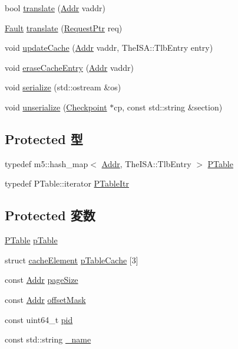 \begin{DoxyCompactItemize}
\item 
bool \hyperlink{classPageTable_a72077eb2c400826c0a18b845a7be0e6a}{translate} (\hyperlink{base_2types_8hh_af1bb03d6a4ee096394a6749f0a169232}{Addr} vaddr)
\item 
\hyperlink{classRefCountingPtr}{Fault} \hyperlink{classPageTable_aacd7f462f681cfd6e11ef22d6fe32557}{translate} (\hyperlink{classRequest}{RequestPtr} req)
\item 
void \hyperlink{classPageTable_ad12e4d4887c4e62c2c8236936053dcd5}{updateCache} (\hyperlink{base_2types_8hh_af1bb03d6a4ee096394a6749f0a169232}{Addr} vaddr, TheISA::TlbEntry entry)
\item 
void \hyperlink{classPageTable_a7a34214b4d368d09f3dee2ee3670b520}{eraseCacheEntry} (\hyperlink{base_2types_8hh_af1bb03d6a4ee096394a6749f0a169232}{Addr} vaddr)
\item 
void \hyperlink{classPageTable_a53e036786d17361be4c7320d39c99b84}{serialize} (std::ostream \&os)
\item 
void \hyperlink{classPageTable_af22e5d6d660b97db37003ac61ac4ee49}{unserialize} (\hyperlink{classCheckpoint}{Checkpoint} $\ast$cp, const std::string \&section)
\end{DoxyCompactItemize}
\subsection*{Protected 型}
\begin{DoxyCompactItemize}
\item 
typedef m5::hash\_\-map$<$ \hyperlink{base_2types_8hh_af1bb03d6a4ee096394a6749f0a169232}{Addr}, TheISA::TlbEntry $>$ \hyperlink{classPageTable_af3d8a3d9e644cad85356d24d9c324628}{PTable}
\item 
typedef PTable::iterator \hyperlink{classPageTable_ae7a302b2a02308ebbb6a164d74a9b2fa}{PTableItr}
\end{DoxyCompactItemize}
\subsection*{Protected 変数}
\begin{DoxyCompactItemize}
\item 
\hyperlink{classPageTable_af3d8a3d9e644cad85356d24d9c324628}{PTable} \hyperlink{classPageTable_af6a1d4146effcb66a42a1a50cdedd71c}{pTable}
\item 
struct \hyperlink{structPageTable_1_1cacheElement}{cacheElement} \hyperlink{classPageTable_a6eb3f78e407d321f98bdaacc9d2768a6}{pTableCache} \mbox{[}3\mbox{]}
\item 
const \hyperlink{base_2types_8hh_af1bb03d6a4ee096394a6749f0a169232}{Addr} \hyperlink{classPageTable_a9e5e4d8007dd2c921971af2a58f86adc}{pageSize}
\item 
const \hyperlink{base_2types_8hh_af1bb03d6a4ee096394a6749f0a169232}{Addr} \hyperlink{classPageTable_a646af22c789b99dbdef2d5d867b6257a}{offsetMask}
\item 
const uint64\_\-t \hyperlink{classPageTable_ae7231756748632307a03aff2b0d3fd8d}{pid}
\item 
const std::string \hyperlink{classPageTable_a1b003dc5cfce1a4d8f9a0c4b9b589045}{\_\-name}
\end{DoxyCompactItemize}


